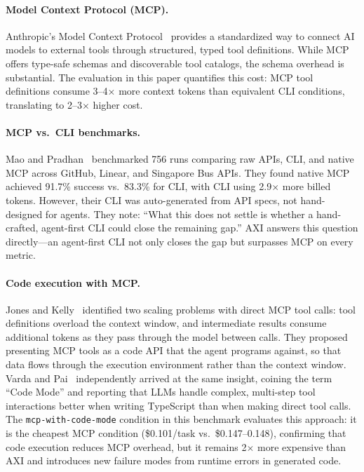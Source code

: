 \documentclass{article}
\begin{document}
\paragraph{Model Context Protocol (MCP).}
Anthropic's Model Context Protocol~\cite{mcp2024} provides a standardized
way to connect AI models to external tools through structured, typed tool
definitions. While MCP offers type-safe schemas and discoverable tool
catalogs, the schema overhead is substantial. The evaluation in this paper quantifies
this cost: MCP tool definitions consume 3--4$\times$ more context tokens
than equivalent CLI conditions, translating to 2--3$\times$ higher cost.

\paragraph{MCP vs.\ CLI benchmarks.}
Mao and Pradhan~\cite{smithery2026} benchmarked 756 runs comparing raw APIs,
CLI, and native MCP across GitHub, Linear, and Singapore Bus APIs. They found
native MCP achieved 91.7\% success vs.\ 83.3\% for CLI, with CLI using
2.9$\times$ more billed tokens. However, their CLI was auto-generated from
API specs, not hand-designed for agents. They note: ``What this does not
settle is whether a hand-crafted, agent-first CLI could close the remaining
gap.'' AXI answers this question directly---an agent-first CLI not only
closes the gap but surpasses MCP on every metric.

\paragraph{Code execution with MCP.}
Jones and Kelly~\cite{anthropic2025code} identified two scaling problems with
direct MCP tool calls: tool definitions overload the context window, and
intermediate results consume additional tokens as they pass through the model
between calls. They proposed presenting MCP tools as a code API that the agent
programs against, so that data flows through the execution environment rather
than the context window. Varda and Pai~\cite{cloudflare2025code} independently
arrived at the same insight, coining the term ``Code Mode'' and reporting that
LLMs handle complex, multi-step tool interactions better when writing
TypeScript than when making direct tool calls. The \texttt{mcp-with-code-mode}
condition in this benchmark evaluates this approach: it is the cheapest MCP
condition (\$0.101/task vs.\ \$0.147--0.148), confirming that code execution
reduces MCP overhead, but it remains 2$\times$ more expensive than AXI and
introduces new failure modes from runtime errors in generated code.
\end{document}

